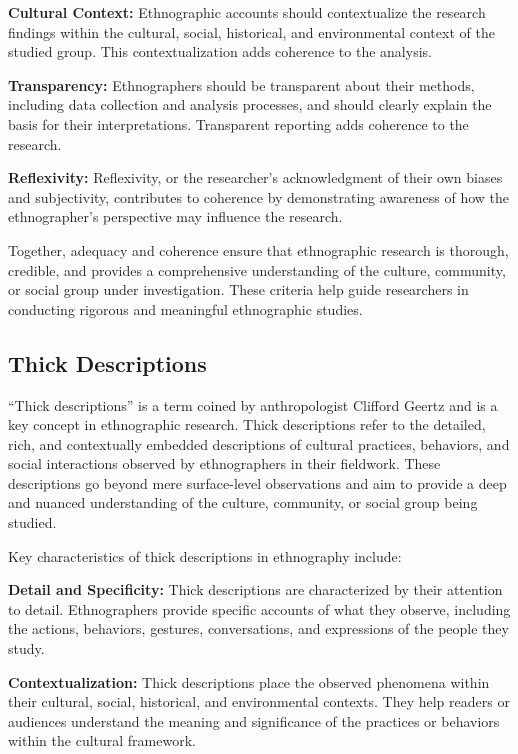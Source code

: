 \documentclass[
  b5paper]{book}
\begin{document}
\textbf{Cultural Context:} Ethnographic accounts should contextualize the research findings within the cultural, social, historical, and environmental context of the studied group. This contextualization adds coherence to the analysis.

\textbf{Transparency:} Ethnographers should be transparent about their methods, including data collection and analysis processes, and should clearly explain the basis for their interpretations. Transparent reporting adds coherence to the research.

\textbf{Reflexivity:} Reflexivity, or the researcher's acknowledgment of their own biases and subjectivity, contributes to coherence by demonstrating awareness of how the ethnographer's perspective may influence the research.

Together, adequacy and coherence ensure that ethnographic research is thorough, credible, and provides a comprehensive understanding of the culture, community, or social group under investigation. These criteria help guide researchers in conducting rigorous and meaningful ethnographic studies.

\hypertarget{thick-descriptions}{%
\subsection*{Thick Descriptions}\label{thick-descriptions}}

``Thick descriptions'' is a term coined by anthropologist Clifford Geertz and is a key concept in ethnographic research. Thick descriptions refer to the detailed, rich, and contextually embedded descriptions of cultural practices, behaviors, and social interactions observed by ethnographers in their fieldwork. These descriptions go beyond mere surface-level observations and aim to provide a deep and nuanced understanding of the culture, community, or social group being studied.

Key characteristics of thick descriptions in ethnography include:

\textbf{Detail and Specificity:} Thick descriptions are characterized by their attention to detail. Ethnographers provide specific accounts of what they observe, including the actions, behaviors, gestures, conversations, and expressions of the people they study.

\textbf{Contextualization:} Thick descriptions place the observed phenomena within their cultural, social, historical, and environmental contexts. They help readers or audiences understand the meaning and significance of the practices or behaviors within the cultural framework.
\end{document}
